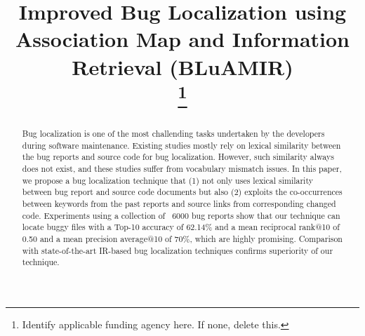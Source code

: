 \documentclass[conference]{IEEEtran}
\begin{document}
\title{Improved Bug Localization using Association Map and Information Retrieval (BLuAMIR)\\
\thanks{Identify applicable funding agency here. If none, delete this.}
}

\author{

}

\maketitle

\begin{abstract}
Bug localization is one of the most challending tasks undertaken by the developers during software maintenance.
Existing studies mostly rely on lexical similarity between the bug reports and source code for bug localization.
However, such similarity always does not exist, and these studies suffer from vocabulary mismatch issues.
In this paper, we propose a bug localization technique that (1) not only uses lexical similarity between bug report and source code documents  
but also (2) exploits the co-occurrences between keywords from the past reports and source links from corresponding changed code.
Experiments using a collection of ~6000 bug reports show that our technique can locate buggy files with a Top-10 accuracy of 62.14\% and a mean reciprocal rank@10 of 0.50 and a mean precision average@10 of 70\%, which are highly promising. 
Comparison with state-of-the-art IR-based bug localization techniques confirms superiority of our technique. 
\end{abstract}
\end{document}
